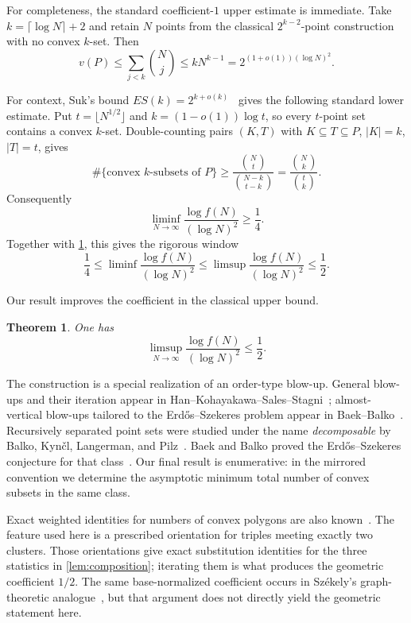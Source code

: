\documentclass[11pt]{article}
\newtheorem{theorem}{Theorem}[section]
\theoremstyle{remark}
\begin{document}
For completeness, the standard coefficient-$1$ upper estimate is immediate.
Take $k=\lceil\log N\rceil+2$ and retain $N$ points from the classical
$2^{k-2}$-point construction with no convex $k$-set.  Then
\[
 v(P)\le\sum_{j<k}\binom Nj\le kN^{k-1}
      =2^{(1+o(1))(\log N)^2}.
\]

For context, Suk's bound $ES(k)=2^{k+o(k)}$~\cite{Suk2017} gives the
following standard lower estimate.  Put $t=\lfloor N^{1/2}\rfloor$ and
$k=(1-o(1))\log t$, so every $t$-point set contains a convex $k$-set.
Double-counting pairs $(K,T)$ with $K\subseteq T\subseteq P$, $|K|=k$,
$|T|=t$, gives
\[
 \#\{\text{convex $k$-subsets of $P$}\}
 \ge \frac{\binom Nt}{\binom{N-k}{t-k}}
 =\frac{\binom Nk}{\binom tk}.
\]
Consequently
\[
 \liminf_{N\to\infty}
 \frac{\log f(N)}{(\log N)^2}\ge\frac14.
\]
Together with \cref{thm:main}, this gives the rigorous window
\[
 \frac14\le\liminf\frac{\log f(N)}{(\log N)^2}
 \le\limsup\frac{\log f(N)}{(\log N)^2}\le\frac12.
\]

Our result improves the coefficient in the classical upper bound.

\begin{theorem}\label{thm:main}
One has
\[
 \limsup_{N\to\infty}
 \frac{\log f(N)}{(\log N)^2}\le\frac12.
\]
\end{theorem}

The construction is a special realization of an order-type blow-up.
General blow-ups and their iteration appear in
Han--Kohayakawa--Sales--Stagni~\cite{HanEtAl2019}; almost-vertical blow-ups
tailored to the Erd\H{o}s--Szekeres problem appear in
Baek--Balko~\cite{BaekBalko2026}.  Recursively separated point sets were
studied under the name \emph{decomposable} by Balko, Kyn\v{c}l, Langerman,
and Pilz~\cite{BalkoEtAl2017}.  Baek and Balko proved the Erd\H{o}s--Szekeres
conjecture for that class~\cite[Theorem~7]{BaekBalko2026}.  Our final result
is enumerative: in the mirrored convention we determine the asymptotic
minimum total number of convex subsets in the same class.

Exact weighted identities for numbers of
convex polygons are also known~\cite{HuemerEtAl2022}.  The feature used here
is a prescribed orientation for triples meeting exactly two clusters.
Those orientations give exact substitution identities for the three
statistics in \cref{lem:composition}; iterating them is what produces the
geometric coefficient $1/2$.  The same base-normalized coefficient occurs
in Sz\'ekely's graph-theoretic analogue~\cite{Szekely1984}, but that argument
does not directly yield the geometric statement here.
\end{document}
